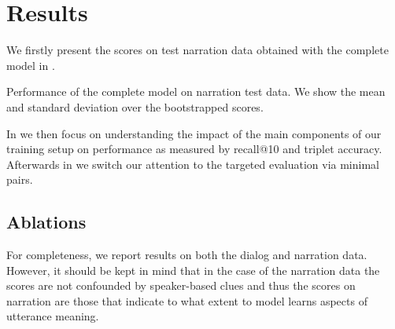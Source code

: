 \section{Results}
\label{sec:results}
We firstly present the scores on test narration data obtained with the
complete model in .
\begin{table}[htb]
  
  \caption{Performance of the complete model on narration test
    data. We show the mean and standard deviation over the
    bootstrapped scores.}
  \label{tab:test_scores}
\end{table}
In  we then focus on understanding the impact of
the main components of our training setup on performance as measured
by recall@10 and triplet accuracy. Afterwards in
 we switch our attention to the targeted
evaluation via minimal pairs.


\subsection{Ablations}
\label{sec:ablations}
For completeness, we report results on both the dialog and narration
data. However, it should be kept in mind that in the case of the
narration data the scores are not confounded by speaker-based clues
and thus the scores on narration are those that indicate to what extent to
model learns aspects of utterance meaning.

